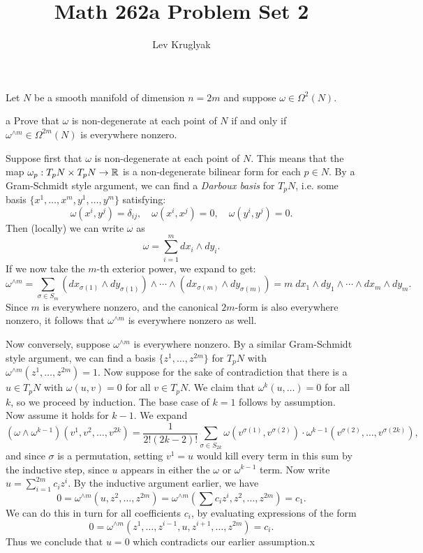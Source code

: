 \documentclass{pset}
\title{Math 262a Problem Set 2}
\author{Lev Kruglyak}
\begin{document}
\maketitle
\collaborators

\begin{problem}{1}
    Let $N$ be a smooth manifold of dimension $n=2m$ and suppose $\omega\in \Omega^2(N)$.
\end{problem}

\begin{parts}
    \begin{part}{a}
        Prove that $\omega$ is non-degenerate at each point of $N$ if and only if $\omega^{\wedge m}\in \Omega^{2m}(N)$ is everywhere nonzero.
    \end{part}

    Suppose first that $\omega$ is non-degenerate at each point of $N$. This means that the map $\omega_p : T_pN\times T_pN \to \mathbb{R}$ is a non-degenerate bilinear form for each $p\in N$. By a Gram-Schmidt style argument, we can find a \emph{Darboux basis} for $T_pN$, i.e. some basis $\{x^1,\ldots,x^m,y^1,\ldots,y^m\}$ satisfying: 
    \[
        \omega(x^i, y^j) = \delta_{ij},\quad \omega(x^i,x^j)=0,\quad\omega(y^i, y^j)=0
    .\] 
    Then (locally) we can write $\omega$ as 
    \[
        \omega = \sum^m_{i= 1} dx_i\wedge dy_i
    .\]  
    If we now take the $m$-th exterior power, we expand to get:
    \[
        \omega^{\wedge m} = \sum_{\sigma\in S_m} (dx_{\sigma(1)}\wedge dy_{\sigma(1)})\wedge\cdots\wedge (dx_{\sigma(m)}\wedge dy_{\sigma(m)})= m\; dx_1\wedge dy_1\wedge\cdots\wedge dx_m\wedge dy_m
    .\] 
    Since $m$ is everywhere nonzero, and the canonical $2m$-form is also everywhere nonzero, it follows that $\omega^{\wedge m}$ is everywhere nonzero as well.

    Now conversely, suppose $\omega^{\wedge m}$ is everywhere nonzero. By a similar Gram-Schmidt style argument, we can find a basis $\{z^1,\ldots,z^{2m}\}$ for $T_pN$ with $\omega^{\wedge m}(z^1,\ldots,z^{2m})=1$. Now suppose for the sake of contradiction that there is a $u\in T_pN$ with $\omega(u,v)=0$ for all $v\in T_pN$. We claim that $\omega^k(u,\ldots) = 0$ for all $k$, so we proceed by induction. The base case of $k=1$ follows by assumption. Now assume it holds for $k-1$. We expand
    \[
        (\omega\wedge\omega^{k-1})(v^1, v^2, \ldots, v^{2k}) = \frac{1}{2! (2k-2)!}\sum_{\sigma\in S_{2k}}\omega(v^{\sigma(1)}, v^{\sigma(2)})\cdot \omega^{k-1}\left(v^{\sigma(2)},\ldots,v^{\sigma(2k)}\right),
    \] 
    and since $\sigma$ is a permutation, setting $v^1=u$ would kill every term in this sum by the inductive step, since $u$ appears in either the $\omega$ or $\omega^{k-1}$ term. Now write $u=\sum^{2m}_{i =1}c_i z^i$. By the inductive argument earlier, we have
    \[
        0=\omega^{\wedge m}(u, z^2, \ldots, z^{2m}) = \omega^{\wedge m}\left(\sum c_i z^i, z^2, \ldots, z^{2m}\right) = c_1
    .\] 
    We can do this in turn for all coefficients $c_i$, by evaluating expressions of the form \[0=\omega^{\wedge m}(z^1,\ldots,z^{i-1}, u, z^{i+1}, \ldots, z^{2m}) = c_i.\]
    Thus we conclude that $u=0$ which contradicts our earlier assumption.x


\end{parts}
\end{document}
